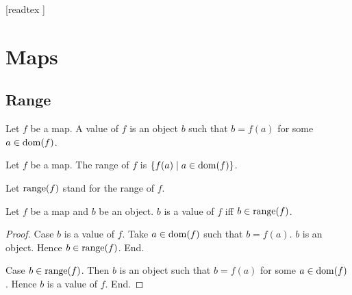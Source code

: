 \documentclass[10pt]{article}
\begin{document}
  \begin{imports}
    \begin{forthel}
      [readtex ]
    \end{forthel}
  \end{imports}


  \section*{Maps}

  \subsection*{Range}

  \begin{forthel}
    \begin{definition}[id=FOUNDATIONS_06_4284980337311744,printid]
      Let $f$ be a map.
      A value of $f$ is an object $b$ such that $b = f(a)$ for some $a \in \operatorname{dom}(f)$.
    \end{definition}
  \end{forthel}

  \begin{forthel}
    \begin{definition}[id=FOUNDATIONS_06_1938831225913344,printid]
      Let $f$ be a map.
      The range of $f$ is $\{ f(a) \mid a \in \operatorname{dom}(f) \}$.
    \end{definition}

    Let $\textrm{range}(f)$ stand for the range of $f$.
  \end{forthel}

  \begin{forthel}
    \begin{proposition}[id=FOUNDATIONS_06_6386349418479616,printid]
      Let $f$ be a map and $b$ be an object.
      $b$ is a value of $f$ iff $b \in \textrm{range}(f)$.
    \end{proposition}
    \begin{proof}
      Case $b$ is a value of $f$.
        Take $a \in \operatorname{dom}(f)$ such that $b = f(a)$.
        $b$ is an object.
        Hence $b \in \textrm{range}(f)$.
      End.

      Case $b \in \textrm{range}(f)$.
        Then $b$ is an object such that $b = f(a)$ for some $a \in \operatorname{dom}(f)$.
        Hence $b$ is a value of $f$.
      End.
    \end{proof}
  \end{forthel}
\end{document}
